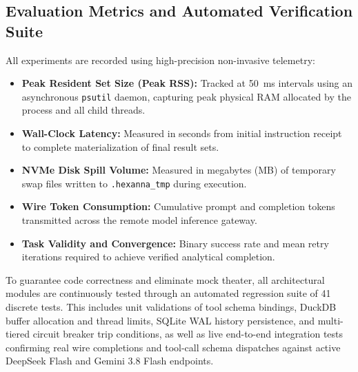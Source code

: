 \subsection{Evaluation Metrics and Automated Verification Suite}
All experiments are recorded using high-precision non-invasive telemetry:
\begin{itemize}
    \item \textbf{Peak Resident Set Size (Peak RSS):} Tracked at 50~ms intervals using an asynchronous \texttt{psutil} daemon, capturing peak physical RAM allocated by the process and all child threads.
    \item \textbf{Wall-Clock Latency:} Measured in seconds from initial instruction receipt to complete materialization of final result sets.
    \item \textbf{NVMe Disk Spill Volume:} Measured in megabytes (MB) of temporary swap files written to \texttt{.hexanna\_tmp} during execution.
    \item \textbf{Wire Token Consumption:} Cumulative prompt and completion tokens transmitted across the remote model inference gateway.
    \item \textbf{Task Validity and Convergence:} Binary success rate and mean retry iterations required to achieve verified analytical completion.
\end{itemize}

To guarantee code correctness and eliminate mock theater, all architectural modules are continuously tested through an automated regression suite of 41 discrete tests. This includes unit validations of tool schema bindings, DuckDB buffer allocation and thread limits, SQLite WAL history persistence, and multi-tiered circuit breaker trip conditions, as well as live end-to-end integration tests confirming real wire completions and tool-call schema dispatches against active DeepSeek Flash and Gemini 3.8 Flash endpoints.
